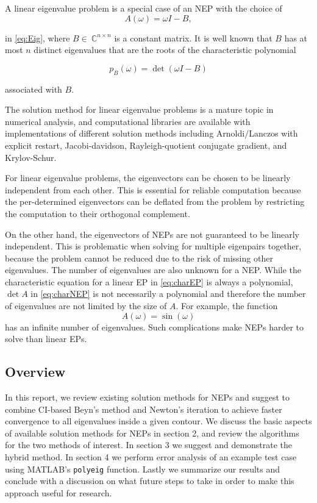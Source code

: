 \documentclass[final,leqno,onefignum,onetabnum]{siamltex1213}
\begin{document}
A linear eigenvalue problem is a special case of an NEP with the choice of 
\begin{equation} 
\label{eq:LEP}
A(\omega )= \omega I - B,
\end{equation}

in \ref{eq:Eig}, where $B \in\ \mathbb{C}^{n \times n}$ is a constant matrix. It is well known that $B$ has at most $n$ distinct eigenvalues that are the roots of the characteristic polynomial

\begin{equation}
	\label{eq:charEP}
	p_{B}(\omega)=\det(\omega I -B)
\end{equation}  

associated with $B$. 

The solution method for linear eigenvalue problems is a mature topic in numerical analysis, and computational libraries are available with implementations of different solution methods including Arnoldi$/$Lanczos with explicit restart, Jacobi-davidson, Rayleigh-quotient conjugate gradient, and Krylov-Schur.  \citep{hernandez2005slepc} 

For linear eigenvalue problems, the eigenvectors can be chosen to be linearly independent from each other. This is essential for reliable computation because the per-determined eigenvectors can be deflated from the problem by restricting the computation to their orthogonal complement. 

On the other hand, the eigenvectors of NEPs are not guaranteed to be linearly independent. This is problematic when solving for multiple eigenpairs together, because the problem cannot be reduced due to the risk of missing other eigenvalues. The number of eigenvalues are also unknown for a NEP. While the characteristic equation for a linear EP in \ref{eq:charEP} is always a polynomial, $\det A$ in \ref{eq:charNEP} is not necessarily a polynomial and therefore the number of eigenvalues are not limited by the size of $A$. For example, the function
\begin{equation*}
A(\omega) = \sin(\omega)
\end{equation*} 
has an infinite number of eigenvalues. Such complications make NEPs harder to solve than linear EPs. 

\subsection{Overview}
In this report, we review existing solution methods for NEPs and suggest to combine CI-based Beyn's method and Newton's iteration to achieve faster convergence to all eigenvalues inside a given contour. We discuss the basic aspects of available solution methods for NEPs in section 2, and review the algorithms for the two methods of interest. In section 3 we suggest and demonstrate the hybrid method. In section 4 we perform error analysis of an example test case using MATLAB's {\tt polyeig} function. Lastly we summarize our results and conclude with a discussion on what future steps to take in order to make this approach useful for research. 
\end{document}
